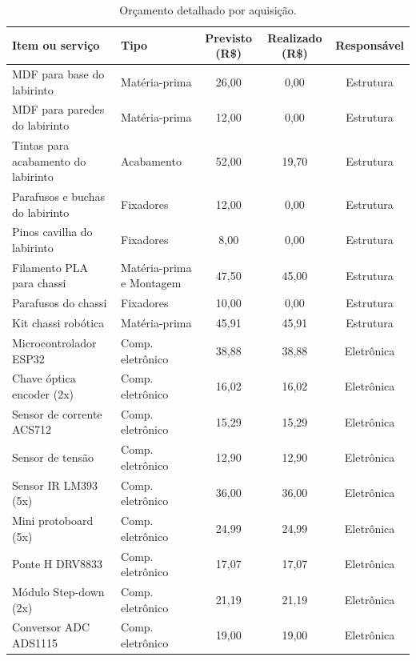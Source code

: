 \begin{landscape}
\begin{table}[htpb]
\begin{center}
\caption{Orçamento detalhado por aquisição.}
\begin{tabular}{|p{7cm}|p{3.5cm}|c|c|c|}
\hline
\textbf{Item ou serviço} & \textbf{Tipo} & \textbf{Previsto (R\$)} & \textbf{Realizado (R\$)} & \textbf{Responsável} \\ \hline
MDF para base do labirinto          & Matéria-prima & 26,00  & 0,00    & Estrutura  \\ \hline
MDF para paredes do labirinto       & Matéria-prima & 12,00  & 0,00    & Estrutura  \\ \hline
Tintas para acabamento do labirinto & Acabamento    & 52,00  & 19,70   & Estrutura  \\ \hline
Parafusos e buchas do labirinto     & Fixadores     & 12,00  & 0,00    & Estrutura  \\ \hline
Pinos cavilha do labirinto          & Fixadores     & 8,00   & 0,00    & Estrutura  \\ \hline
Filamento PLA para chassi           & Matéria-prima e Montagem & 47,50   & 45,00   & Estrutura  \\ \hline
Parafusos do chassi                 & Fixadores     & 10,00  & 0,00    & Estrutura  \\ \hline
Kit chassi robótica                 & Matéria-prima & 45,91  & 45,91   & Estrutura  \\ \hline
Microcontrolador ESP32              & Comp. eletrônico & 38,88  & 38,88  & Eletrônica \\ \hline
Chave óptica encoder (2x)           & Comp. eletrônico & 16,02  & 16,02  & Eletrônica \\ \hline
Sensor de corrente ACS712           & Comp. eletrônico & 15,29  & 15,29  & Eletrônica \\ \hline
Sensor de tensão                    & Comp. eletrônico & 12,90  & 12,90  & Eletrônica \\ \hline
Sensor IR LM393 (5x)                & Comp. eletrônico & 36,00  & 36,00  & Eletrônica \\ \hline
Mini protoboard (5x)                & Comp. eletrônico & 24,99  & 24,99  & Eletrônica \\ \hline
Ponte H DRV8833                     & Comp. eletrônico & 17,07  & 17,07  & Eletrônica \\ \hline
Módulo Step-down (2x)               & Comp. eletrônico & 21,19  & 21,19  & Eletrônica \\ \hline
Conversor ADC ADS1115               & Comp. eletrônico & 19,00  & 19,00  & Eletrônica \\ \hline

\end{tabular}
\end{center}
\end{table}
\end{landscape}
